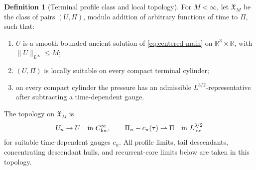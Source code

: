 \documentclass[11pt]{amsart}
\numberwithin{equation}{section}
\theoremstyle{plain}
\theoremstyle{definition}
\newtheorem{definition}[definition]{Definition}
\theoremstyle{remark}
\newcommand{\loc}{\mathrm{loc}}
\begin{document}
\begin{definition}[Terminal profile class and local topology]
\label{def:terminal-state-space}
For \(M<\infty\), let \(\mathfrak X_M\) be the class of pairs
\((U,\Pi)\), modulo addition of arbitrary functions of time to \(\Pi\), such
that:
\begin{enumerate}[label=\textup{(\roman*)}]
   \item \(U\) is a smooth bounded ancient solution of
   \eqref{eq:centered-main} on \(\mathbb R^3\times\mathbb R\), with
   \(\|U\|_{L^\infty}\le M\);
   \item \((U,\Pi)\) is locally suitable on every compact terminal cylinder;
   \item on every compact cylinder the pressure has an admissible
   \(L^{3/2}\)-representative after subtracting a time-dependent gauge.
\end{enumerate}
The topology on \(\mathfrak X_M\) is
\[
   U_n\to U \quad\hbox{in }C^\infty_{\loc},
   \qquad
   \Pi_n-c_n(\tau)\rightharpoonup \Pi
      \quad\hbox{in }L^{3/2}_{\loc}
\]
for suitable time-dependent gauges \(c_n\).  All profile limits, tail
descendants, concentrating descendant hulls, and recurrent-core limits below are taken in
this topology.
\end{definition}
\end{document}
